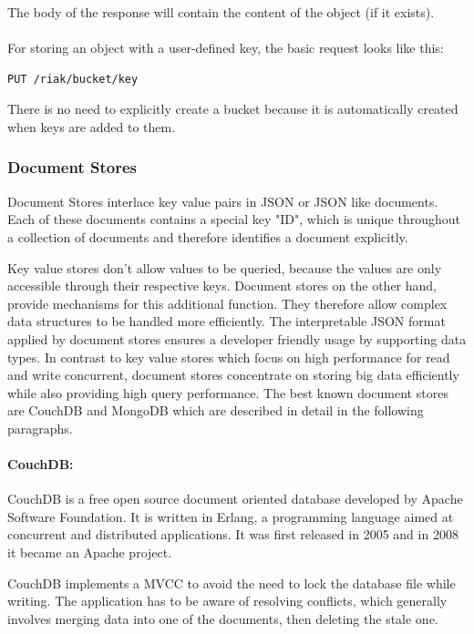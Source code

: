 The body of the response will contain the content of the object (if it exists).
\\
\\
For storing an object with a user-defined key, the basic request looks like this:

\begin{code}
\begin{verbatim}
PUT /riak/bucket/key
\end{verbatim}
\label{lst:riak_get}
\end{code}

There is no need to explicitly create a bucket because it is automatically created when keys are added to them.


\subsubsection{Document Stores}
Document Stores interlace key value pairs in \ac{JSON} or \ac{JSON} like documents. Each of these documents contains a special key "ID", which is unique throughout a collection of documents and therefore identifies a document explicitly. 

Key value stores don't allow values to be queried, because the values are only accessible through their respective keys. Document stores on the other hand, provide mechanisms for this additional function. They therefore allow complex data structures to be handled more efficiently. The interpretable \ac{JSON} format applied by document stores ensures a developer friendly usage by supporting data types. In contrast to key value stores which focus on high performance for read and write concurrent, document stores concentrate on storing big data efficiently while also providing high query performance. The best known document stores are CouchDB and MongoDB  which are described in detail in the following paragraphs.

\paragraph{CouchDB:} CouchDB is a free open source document oriented database developed by Apache Software Foundation. It is written in Erlang, a programming language aimed at concurrent and distributed applications. It was first released in 2005 and in 2008 it became an Apache project.

CouchDB implements a \ac{MVCC} to avoid the need to lock the database file while writing. The application has to be aware of resolving conflicts, which generally involves merging data into one of the documents, then deleting the stale one.

